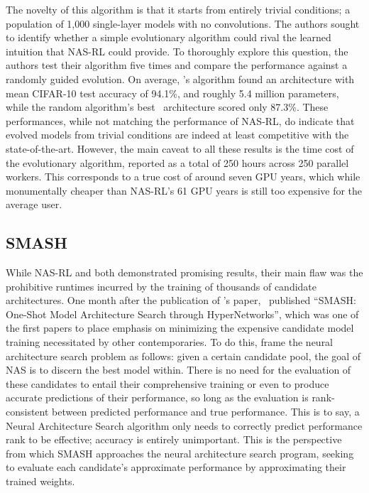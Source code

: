 The novelty of this algorithm is that it starts from entirely trivial conditions; a population of 1,000 single-layer models
with no convolutions. The authors sought to identify whether a simple evolutionary algorithm could rival the learned
intuition that NAS-RL could provide. To thoroughly explore this question, the authors test their algorithm five times and
compare the performance against a randomly guided evolution. On average, \citeauthor{real2017}'s algorithm found an architecture
with mean CIFAR-10 test accuracy of 94.1\%, and roughly 5.4 million parameters, while the random algorithm's best \
architecture scored only 87.3\%. These performances, while not matching the performance of NAS-RL, do indicate that
evolved models from trivial conditions are indeed at least competitive with the state-of-the-art. However,
the main caveat to all these results is the time cost of the evolutionary
algorithm, reported as a total of 250 hours across 250 parallel workers. This corresponds to a true cost of around seven GPU
years, which while monumentally cheaper than NAS-RL's 61 GPU years is still too expensive for the average user.

\subsection{SMASH}
While NAS-RL and  both demonstrated promising results, their main flaw was the prohibitive runtimes
incurred by the training of thousands of candidate architectures. One month after the publication of \citeauthor{real2017}'s
\added{Neuroevolution-NAS} paper,~\citeauthor{brock2017} published ``SMASH: One-Shot Model Architecture Search through HyperNetworks'',
which was one of the first papers to place emphasis on minimizing the expensive candidate model training necessitated
by other contemporaries. To do this, \citeauthor{brock2017} frame the neural architecture search problem as follows:
given a certain candidate pool, the goal of NAS is to discern the best model within. There is no need for the evaluation
of these candidates to entail their comprehensive training or even to produce accurate predictions of their performance,
so long as the evaluation is rank-consistent between predicted performance and true performance. This is to say, a Neural
Architecture Search algorithm only needs to correctly predict performance rank to be effective;
accuracy is entirely unimportant. This is the perspective from which SMASH approaches the neural architecture search
program, seeking to evaluate each candidate's approximate performance by approximating their trained weights.

